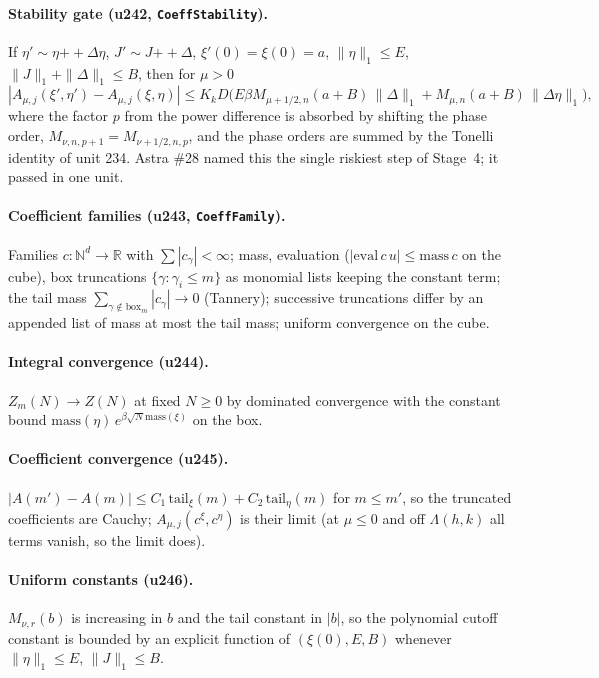 \documentclass[11pt]{article}
\begin{document}
\paragraph{Stability gate (u242, \texttt{CoeffStability}).} If $\eta'\sim\eta\mathbin{+\!\!+}\Delta\eta$,
$J'\sim J\mathbin{+\!\!+}\Delta$, $\xi'(0)=\xi(0)=a$, $\|\eta\|_1\le E$, $\|J\|_1+\|\Delta\|_1\le B$, then for
$\mu>0$
\[
|A_{\mu,j}(\xi',\eta')-A_{\mu,j}(\xi,\eta)|
\le K_kD\bigl(E\beta M_{\mu+1/2,n}(a+B)\,\|\Delta\|_1+M_{\mu,n}(a+B)\,\|\Delta\eta\|_1\bigr),
\]
where the factor $p$ from the power difference is absorbed by shifting the phase order,
$M_{\nu,n,p+1}=M_{\nu+1/2,n,p}$, and the phase orders are summed by the Tonelli identity of unit 234.
Astra \#28 named this the single riskiest step of Stage~4; it passed in one unit.

\paragraph{Coefficient families (u243, \texttt{CoeffFamily}).} Families $c:\mathbb N^d\to\mathbb R$ with
$\sum|c_\gamma|<\infty$; mass, evaluation ($|\mathrm{eval}\,c\,u|\le\mathrm{mass}\,c$ on the cube), box
truncations $\{\gamma:\gamma_i\le m\}$ as monomial lists keeping the constant term; the tail mass
$\sum_{\gamma\notin\mathrm{box}_m}|c_\gamma|\to0$ (Tannery); successive truncations differ by an
appended list of mass at most the tail mass; uniform convergence on the cube.

\paragraph{Integral convergence (u244).} $Z_m(N)\to Z(N)$ at fixed $N\ge0$ by dominated convergence
with the constant bound $\mathrm{mass}(\eta)\,e^{\beta\sqrt N\mathrm{mass}(\xi)}$ on the box.

\paragraph{Coefficient convergence (u245).} $|A(m')-A(m)|\le C_1\,\mathrm{tail}_\xi(m)+C_2\,\mathrm{tail}_\eta(m)$
for $m\le m'$, so the truncated coefficients are Cauchy; $A_{\mu,j}(c^\xi,c^\eta)$ is their limit (at
$\mu\le0$ and off $\Lambda(h,k)$ all terms vanish, so the limit does).

\paragraph{Uniform constants (u246).} $M_{\nu,r}(b)$ is increasing in $b$ and the tail constant in
$|b|$, so the polynomial cutoff constant is bounded by an explicit function of $(\xi(0),E,B)$ whenever
$\|\eta\|_1\le E$, $\|J\|_1\le B$.
\end{document}
